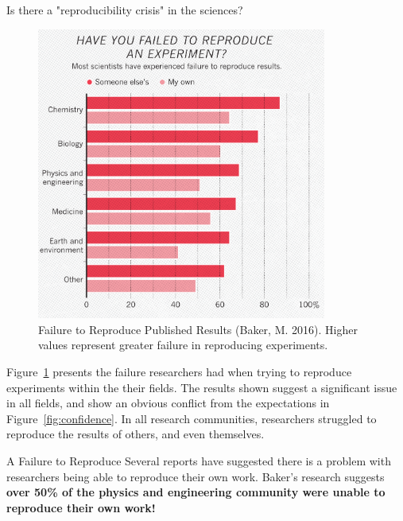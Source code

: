 \documentclass[final]{beamer}
\newlength{\colwidth}
\begin{document}
\begin{frame}[t]
\begin{columns}[t]
\begin{column}{\colwidth}
\begin{block}{Is there a "reproducibility crisis" in the sciences?}
    \begin{figure}
      \centering
      \includegraphics[width=0.85\textwidth]{tess2024/Nature-Reproducibility-Failure.png}
      \caption{Failure to Reproduce Published Results (Baker, M. 2016)\cite{baker2016}.
      Higher values represent greater failure in reproducing experiments.}
      \label{fig:failure}
    \end{figure}
    
    Figure~\ref*{fig:failure} presents the failure researchers had when trying
    to reproduce experiments within the their fields.
    The results shown suggest a significant issue in all fields, and show an
    obvious conflict from the expectations in Figure~\ref*{fig:confidence}.
    In all research communities, researchers struggled to reproduce the results
    of others, and even themselves.

  \end{block}

  \begin{alertblock}{A Failure to Reproduce}
    Several reports have suggested there is a problem with researchers being
    able to reproduce their own work.
    Baker's research\cite{baker2016} suggests \textbf{over 50\% of the physics
    and engineering community were unable to reproduce their own work!}

  \end{alertblock}


\end{column}
\end{columns}
\end{frame}
\end{document}
